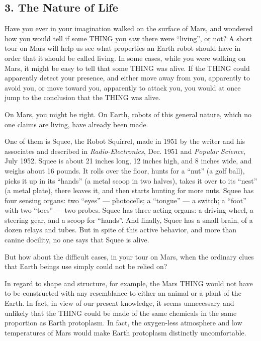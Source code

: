 \documentclass[11pt]{article}
\begin{document}
\subsection*{3. The Nature of Life}

Have you ever in your imagination walked on the surface of Mars, and wondered
how you would tell if some THING you saw there were ``living'', or not? A
short tour on Mars will help us see what properties an Earth robot should have
in order that it should be called living. In some cases, while you were
walking on Mars, it might be easy to tell that some THING was alive. If the
THING could apparently detect your presence, and either move away from you,
apparently to avoid you, or move toward you, apparently to attack you, you
would at once jump to the conclusion that the THING was alive.

On Mars, you might be right. On Earth, robots of this general nature, which no
one claims are living, have already been made.

One of them is Squee, the Robot Squirrel, made in 1951 by the writer and his
associates and described in \emph{Radio-Electronics}, Dec. 1951 and
\emph{Popular Science}, July 1952. Squee is about 21 inches long, 12 inches
high, and 8 inches wide, and weighs about 16 pounds. It rolls over the floor,
hunts for a ``nut'' (a golf ball), picks it up in its ``hands'' (a metal scoop
in two halves), takes it over to its ``nest'' (a metal plate), there leaves
it, and then starts hunting for more nuts. Squee has four sensing organs: two
``eyes'' --- photocells; a ``tongue'' --- a switch; a ``foot'' with two
``toes'' --- two probes. Squee has three acting organs: a driving wheel, a
steering gear, and a scoop for ``hands''. And finally, Squee has a small brain,
of a dozen relays and tubes. But in spite of this active behavior, and more
than canine docility, no one says that Squee is alive.

But how about the difficult cases, in your tour on Mars, when the ordinary
clues that Earth beings use simply could not be relied on?

In regard to shape and structure, for example, the Mars THING would not have to
be constructed with any resemblance to either an animal or a plant of the
Earth. In fact, in view of our present knowledge, it seems unnecessary and
unlikely that the THING could be made of the same chemicals in the same
proportion as Earth protoplasm. In fact, the oxygen-less atmosphere and low
temperatures of Mars would make Earth protoplasm distinctly uncomfortable.
\end{document}
